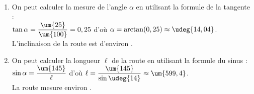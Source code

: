\ \\ [-5mm]
   \begin{enumerate}
      \item On peut calculer la mesure de l'angle $\alpha$ en utilisant la formule de la tangente : \\ [1mm]
         $\tan \alpha =\dfrac{\um{25}}{\um{100}} =0,25$ d'où $\alpha =\arctan(0,25) \approx\udeg{14,04}$. \\ [1mm]
         {\blue L'inclinaison de la route est d'environ }.
      \item On peut calculer la longueur $\ell$ de la route en utilisant la formule du sinus : \\ [1mm]
         $\sin\alpha =\dfrac{\um{145}}{\ell}$ d'où $\ell =\dfrac{\um{145}}{\sin \udeg{14}} \approx \um{599,4}$. \\ [1mm]
         {\blue La route mesure environ .}
   \end{enumerate}

